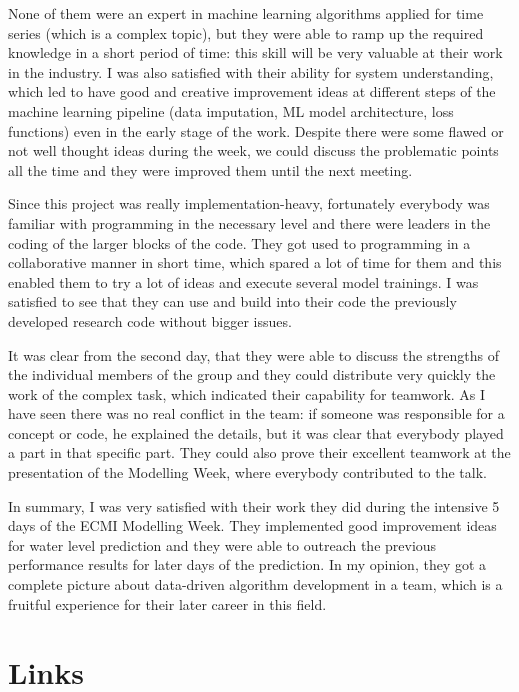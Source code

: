 \documentclass{article}
\begin{document}
None of them were an expert in machine learning algorithms applied for time
series (which is a complex topic), but they were able to ramp up the required
knowledge in a short period of time: this skill will be very valuable at their
work in the industry. I was also satisfied with their ability for system
understanding, which led to have good and creative improvement ideas at
different steps of the machine learning pipeline (data imputation, ML model
architecture, loss functions) even in the early stage of the work. Despite
there were some flawed or not well thought ideas during the week, we could
discuss the problematic points all the time and they were improved them until
the next meeting.

Since this project was really implementation-heavy, fortunately everybody was
familiar with programming in the necessary level and there were leaders in the
coding of the larger blocks of the code. They got used to programming in a
collaborative manner in short time, which spared a lot of time for them and
this enabled them to try a lot of ideas and execute several model trainings. I
was satisfied to see that they can use and build into their code the
previously developed research code without bigger issues.

It was clear from the second day, that they were able to discuss the strengths
of the individual members of the group and they could distribute very quickly
the work of the complex task, which indicated their capability for teamwork.
As I have seen there was no real conflict in the team: if someone was
responsible for a concept or code, he explained the details, but it was clear
that everybody played a part in that specific part. They could also prove
their excellent teamwork at the presentation of the Modelling Week, where
everybody contributed to the talk.

In summary, I was very satisfied with their work they did during the intensive
5 days of the ECMI Modelling Week. They implemented good improvement ideas for
water level prediction and they were able to outreach the previous performance
results for later days of the prediction. In my opinion, they got a complete
picture about data-driven algorithm development in a team, which is a fruitful
experience for their later career in this field.

\section{Links}
\end{document}
